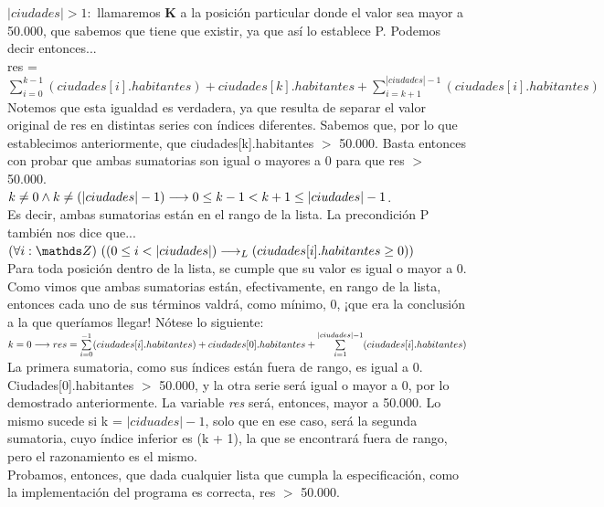 \documentclass[10pt,a4paper]{article}
\begin{document}
$|ciudades| > 1:$ llamaremos \textbf{K} a la posición particular donde el valor sea mayor a 50.000, que sabemos que tiene que existir, ya que así lo establece P. Podemos decir entonces...\\

res = $\sum\limits_{i=0}^{k - 1}(ciudades[i].habitantes) + ciudades[k].habitantes + \sum\limits_{i=k+1}^{|ciudades| - 1}(ciudades[i].habitantes)$\\
Notemos que esta igualdad es verdadera, ya que resulta de separar el valor original de res en distintas series con índices diferentes. Sabemos que, por lo que establecimos anteriormente, que ciudades[k].habitantes $>$ 50.000. Basta entonces con probar que ambas sumatorias son igual o mayores a 0 para que res $>$ 50.000.\\

$k \neq 0 \wedge k \neq (|ciudades| - 1) \longrightarrow 0 \leq k - 1 < k + 1 \leq |ciudades| - 1$. \\

Es decir, ambas sumatorias están en el rango de la lista. La precondición P también nos dice que...\\

$\paraTodo[unalinea]{i}{\ent}{(0 \leq i < |ciudades|) \implicaLuego (ciudades[i].habitantes \geq 0)}$\\

Para toda posición dentro de la lista, se cumple que su valor es igual o mayor a 0. Como vimos que ambas sumatorias están, efectivamente, en rango de la lista, entonces cada uno de sus términos valdrá, como mínimo, 0, ¡que era la conclusión a la que queríamos llegar! Nótese lo siguiente:\\

$k = 0 \longrightarrow res = \sum\limits_{i=0}^{-1}(ciudades[i].habitantes) + ciudades[0].habitantes + \sum\limits_{i=1}^{|ciudades| - 1}(ciudades[i].habitantes)$ \\

La primera sumatoria, como sus índices están fuera de rango, es igual a 0. Ciudades[0].habitantes $>$ 50.000, y la otra serie será igual o mayor a 0, por lo demostrado anteriormente. La variable \textit{res} será, entonces, mayor a 50.000. Lo mismo sucede si k = $|ciduades| - 1$, solo que en ese caso, será la segunda sumatoria, cuyo índice inferior es (k + 1), la que se encontrará fuera de rango, pero el razonamiento es el mismo.\\

Probamos, entonces, que dada cualquier lista que cumpla la especificación, como la implementación del programa es correcta, res $>$ 50.000.
\end{document}
